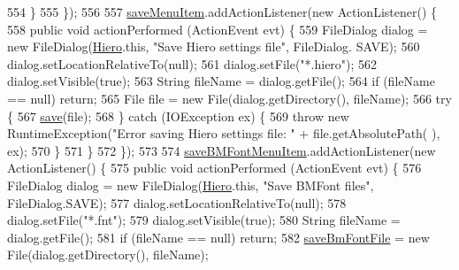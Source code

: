 \begin{DoxyCode}
554             \}
555         \});
556 
557         \mbox{\hyperlink{classorg_1_1newdawn_1_1slick_1_1tools_1_1hiero_1_1_hiero_a718e4dc3618321c479640f1444da4964}{saveMenuItem}}.addActionListener(\textcolor{keyword}{new} ActionListener() \{
558             \textcolor{keyword}{public} \textcolor{keywordtype}{void} actionPerformed (ActionEvent evt) \{
559                 FileDialog dialog = \textcolor{keyword}{new} FileDialog(\mbox{\hyperlink{classorg_1_1newdawn_1_1slick_1_1tools_1_1hiero_1_1_hiero_ad35908dac0e9755fd418874dff6d2dcd}{Hiero}}.this, \textcolor{stringliteral}{"Save Hiero settings file"}, FileDialog.
      SAVE);
560                 dialog.setLocationRelativeTo(null);
561                 dialog.setFile(\textcolor{stringliteral}{"*.hiero"});
562                 dialog.setVisible(\textcolor{keyword}{true});
563                 String fileName = dialog.getFile();
564                 \textcolor{keywordflow}{if} (fileName == null) \textcolor{keywordflow}{return};
565                 File file = \textcolor{keyword}{new} File(dialog.getDirectory(), fileName);
566                 \textcolor{keywordflow}{try} \{
567                     \mbox{\hyperlink{classorg_1_1newdawn_1_1slick_1_1tools_1_1hiero_1_1_hiero_a078b77ff73e2286fc28b18c9a4f318a6}{save}}(file);
568                 \} \textcolor{keywordflow}{catch} (IOException ex) \{
569                     \textcolor{keywordflow}{throw} \textcolor{keyword}{new} RuntimeException(\textcolor{stringliteral}{"Error saving Hiero settings file: "} + file.getAbsolutePath(
      ), ex);
570                 \}
571             \}
572         \});
573 
574         \mbox{\hyperlink{classorg_1_1newdawn_1_1slick_1_1tools_1_1hiero_1_1_hiero_a5591ce9dfc64eb4e3512ac22813e6a42}{saveBMFontMenuItem}}.addActionListener(\textcolor{keyword}{new} ActionListener() \{
575             \textcolor{keyword}{public} \textcolor{keywordtype}{void} actionPerformed (ActionEvent evt) \{
576                 FileDialog dialog = \textcolor{keyword}{new} FileDialog(\mbox{\hyperlink{classorg_1_1newdawn_1_1slick_1_1tools_1_1hiero_1_1_hiero_ad35908dac0e9755fd418874dff6d2dcd}{Hiero}}.this, \textcolor{stringliteral}{"Save BMFont files"}, FileDialog.SAVE);
577                 dialog.setLocationRelativeTo(null);
578                 dialog.setFile(\textcolor{stringliteral}{"*.fnt"});
579                 dialog.setVisible(\textcolor{keyword}{true});
580                 String fileName = dialog.getFile();
581                 \textcolor{keywordflow}{if} (fileName == null) \textcolor{keywordflow}{return};
582                 \mbox{\hyperlink{classorg_1_1newdawn_1_1slick_1_1tools_1_1hiero_1_1_hiero_a91a948679db9a82ae3a8e25e377967be}{saveBmFontFile}} = \textcolor{keyword}{new} File(dialog.getDirectory(), fileName);

\end{DoxyCode}
